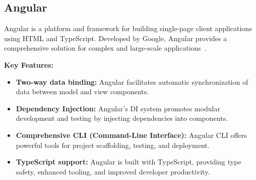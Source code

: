 



\subsection{Angular}

Angular is a platform and framework for building single-page client applications using HTML and TypeScript. Developed by Google, Angular provides a comprehensive solution for complex and large-scale applications~\cite{angular-io}.

\textbf{Key Features:}
\begin{itemize}[label=\textbullet]
    \item \textbf{Two-way data binding:} Angular facilitates automatic synchronization of data between model and view components.
    \item \textbf{Dependency Injection:} Angular's DI system promotes modular development and testing by injecting dependencies into components.
    \item \textbf{Comprehensive CLI (Command-Line Interface):} Angular CLI offers powerful tools for project scaffolding, testing, and deployment.
    \item \textbf{TypeScript support:} Angular is built with TypeScript, providing type safety, enhanced tooling, and improved developer productivity.
\end{itemize}

